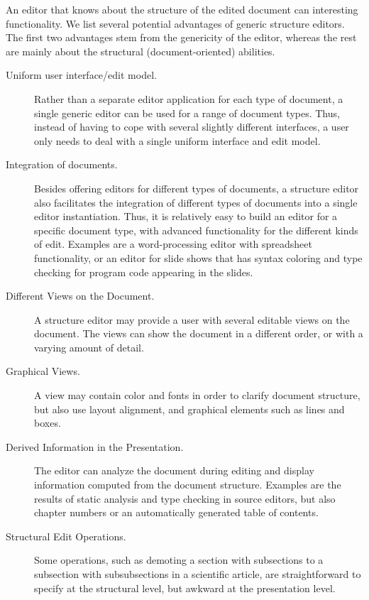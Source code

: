 An editor that knows about the structure of the edited document can interesting functionality. We list several potential advantages of generic structure editors. The first two advantages stem from the genericity of the editor, whereas the rest are mainly about the structural (document-oriented) abilities.

\begin{description}
\item[Uniform user interface/edit model.] Rather than a separate editor application for each type of document, a single generic editor can be used for a range of document types. Thus, instead of having to cope with several slightly different interfaces, a user only needs to deal with a single uniform interface and edit model.

\item[Integration of documents.] Besides offering editors for different types of documents, a structure editor also facilitates the integration of different types of documents into a single editor instantiation. Thus, it is relatively easy to build an editor for a specific document type, with advanced functionality for the different kinds of edit. Examples are a word-processing editor with spreadsheet functionality, or an editor for slide shows that has syntax coloring and type checking for program code appearing in the slides.

\item[Different Views on the Document.] A structure editor may provide a user with several editable views on the document. The views can show the document in a different order, or with a varying amount of detail. 

\item[Graphical Views.] A view may contain color and fonts in order to clarify document structure, but also use layout alignment, and graphical elements such as lines and boxes.

\item[Derived Information in the Presentation.] The editor can analyze the document during editing and display information computed from the document structure. Examples are the results of static analysis and type checking in source editors, but also chapter numbers or an automatically generated table of contents.

\item[Structural Edit Operations.] Some operations, such as demoting a section with subsections to a subsection with subsubsections in a scientific article, are straightforward to specify at the structural level, but awkward at the presentation level.


\end{description}
